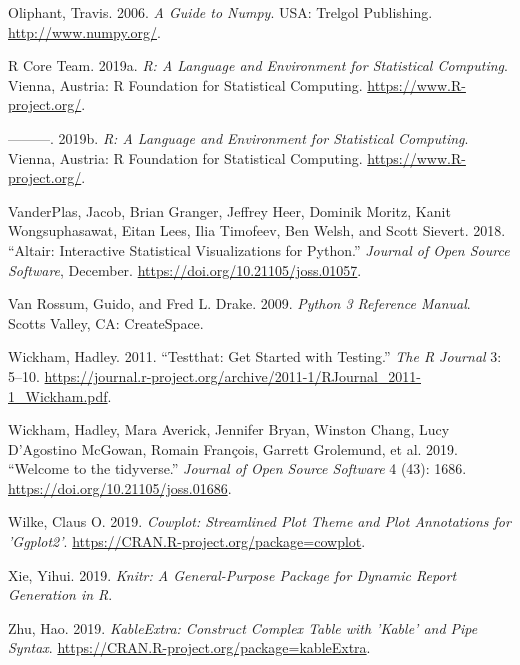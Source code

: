 \documentclass[]{article}
\begin{document}
\leavevmode\hypertarget{ref-numpy}{}%
Oliphant, Travis. 2006. \emph{A Guide to Numpy}. USA: Trelgol
Publishing. \url{http://www.numpy.org/}.

\leavevmode\hypertarget{ref-R}{}%
R Core Team. 2019a. \emph{R: A Language and Environment for Statistical
Computing}. Vienna, Austria: R Foundation for Statistical Computing.
\url{https://www.R-project.org/}.

\leavevmode\hypertarget{ref-tools}{}%
---------. 2019b. \emph{R: A Language and Environment for Statistical
Computing}. Vienna, Austria: R Foundation for Statistical Computing.
\url{https://www.R-project.org/}.

\leavevmode\hypertarget{ref-altair}{}%
VanderPlas, Jacob, Brian Granger, Jeffrey Heer, Dominik Moritz, Kanit
Wongsuphasawat, Eitan Lees, Ilia Timofeev, Ben Welsh, and Scott Sievert.
2018. ``Altair: Interactive Statistical Visualizations for Python.''
\emph{Journal of Open Source Software}, December.
\url{https://doi.org/10.21105/joss.01057}.

\leavevmode\hypertarget{ref-Python}{}%
Van Rossum, Guido, and Fred L. Drake. 2009. \emph{Python 3 Reference
Manual}. Scotts Valley, CA: CreateSpace.

\leavevmode\hypertarget{ref-testthat}{}%
Wickham, Hadley. 2011. ``Testthat: Get Started with Testing.'' \emph{The
R Journal} 3: 5--10.
\url{https://journal.r-project.org/archive/2011-1/RJournal_2011-1_Wickham.pdf}.

\leavevmode\hypertarget{ref-tidyverse}{}%
Wickham, Hadley, Mara Averick, Jennifer Bryan, Winston Chang, Lucy
D'Agostino McGowan, Romain François, Garrett Grolemund, et al. 2019.
``Welcome to the tidyverse.'' \emph{Journal of Open Source Software} 4
(43): 1686. \url{https://doi.org/10.21105/joss.01686}.

\leavevmode\hypertarget{ref-cowplot}{}%
Wilke, Claus O. 2019. \emph{Cowplot: Streamlined Plot Theme and Plot
Annotations for 'Ggplot2'}.
\url{https://CRAN.R-project.org/package=cowplot}.

\leavevmode\hypertarget{ref-knitr}{}%
Xie, Yihui. 2019. \emph{Knitr: A General-Purpose Package for Dynamic
Report Generation in R}.

\leavevmode\hypertarget{ref-kableextra}{}%
Zhu, Hao. 2019. \emph{KableExtra: Construct Complex Table with 'Kable'
and Pipe Syntax}. \url{https://CRAN.R-project.org/package=kableExtra}.
\end{document}
